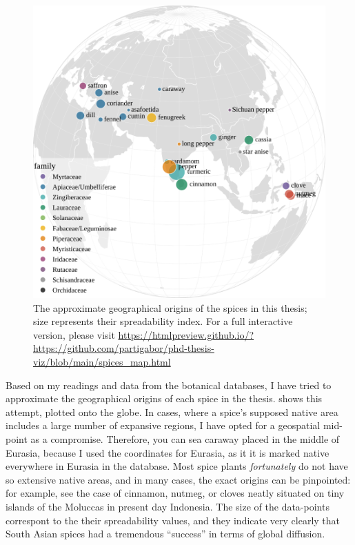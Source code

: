 \begin{figure}[ht!]
  \includegraphics[width=\linewidth]{imgs/plots/spices_map.pdf}
  \caption{The approximate geographical origins of the spices in this thesis; size represents their spreadability index. For a full interactive version, please visit \url{https://htmlpreview.github.io/?https://github.com/partigabor/phd-thesis-viz/blob/main/spices_map.html}}
  \label{fig:spices_map}
\end{figure}



\noindent Based on my readings and data from the botanical databases, I have tried to approximate the geographical origins of each spice in the thesis.  shows this attempt, plotted onto the globe. In cases, where a spice's supposed native area includes a large number of expansive regions, I have opted for a geospatial mid-point as a compromise. Therefore, you can sea caraway placed in the middle of Eurasia, because I used the coordinates for Eurasia, as it it is marked native everywhere in Eurasia in the database. Most spice plants \textit{fortunately} do not have so extensive native areas, and in many cases, the exact origins can be pinpointed: for example, see the case of cinnamon, nutmeg, or cloves neatly situated on tiny islands of the Moluccas in present day Indonesia. %
The size of the data-points correspont to the their spreadability values, and they indicate very clearly that South Asian spices had a tremendous ``success'' in terms of global diffusion.   


